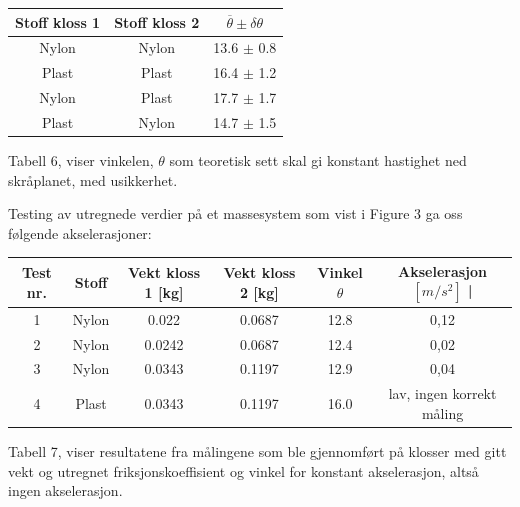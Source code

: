 \documentclass[10pt,a4paper]{report}
\begin{document}
\begin{center}
  \begin{tabular}{| c | c | c |}
    \hline
    Stoff kloss 1 & Stoff kloss 2 & $\overline{\theta} \pm \delta\theta$ \\ \hline
    Nylon & Nylon & 13.6 $\pm$ 0.8 \\ \hline
    Plast & Plast & 16.4 $\pm$ 1.2 \\ \hline
    Nylon & Plast & 17.7 $\pm$ 1.7 \\ \hline
    Plast & Nylon & 14.7 $\pm$ 1.5  \\ \hline
  \end{tabular}
     \begin{tablenotes}
 	\small
 	\item Tabell 6, viser vinkelen, $\theta$ som teoretisk sett skal gi konstant hastighet ned skråplanet, med usikkerhet.
 	\end{tablenotes}
\end{center}
Testing av utregnede verdier på et massesystem som vist i Figure 3 ga oss følgende akselerasjoner:

\begin{center}
  \begin{tabular}{| c | c | c | c | c  | c |}
    \hline
    Test nr. & Stoff & Vekt kloss 1 [kg] & Vekt kloss 2 [kg] & Vinkel $\theta$ & Akselerasjon $[m/s^2]$ | \\ \hline
    1 & Nylon & 0.022 & 0.0687 & 12.8 & 0,12 \\ \hline
    2 & Nylon & 0.0242 & 0.0687 & 12.4 & 0,02 \\ \hline
    3 & Nylon & 0.0343 & 0.1197 & 12.9 & 0,04 \\ \hline
    4 & Plast & 0.0343 & 0.1197 & 16.0 & lav, ingen korrekt måling  \\ \hline
  \end{tabular}
     \begin{tablenotes}
 	\small
 	\item Tabell 7, viser resultatene fra målingene som ble gjennomført på klosser med gitt vekt og utregnet friksjonskoeffisient og vinkel for konstant akselerasjon, altså ingen akselerasjon.
 	\end{tablenotes}
\end{center}
\end{document}

